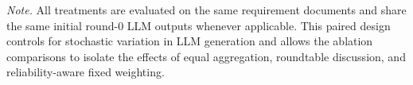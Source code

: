 \begin{table}[t]
{\begin{tabular}{p{2.6cm}p{3.2cm}p{2.2cm}p{2.2cm}p{2.2cm}p{4.0cm}}
\bottomrule
\end{tabular}%
}

\vspace{0.4em}
\begin{minipage}{0.97\textwidth}
\footnotesize
\textit{Note.} All treatments are evaluated on the same requirement documents and share the same initial round-0 LLM outputs whenever applicable. This paired design controls for stochastic variation in LLM generation and allows the ablation comparisons to isolate the effects of equal aggregation, roundtable discussion, and reliability-aware fixed weighting.
\end{minipage}
\end{table}
